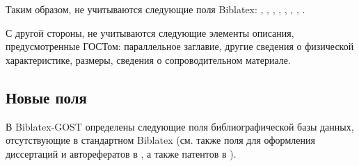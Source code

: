 \documentclass[10pt,a4paper,headings=small,numbers=enddot,english,russian]{ltxdockit}[2011/03/25]
\newcommand*{\biblatex}{Biblatex\xspace}
\newcommand*{\biblatexgost}{Biblatex-GOST\xspace}
\begin{document}
\endgroup

Таким образом, не учитываются следующие поля \biblatex:
, ,
, , , ,
, .

С другой стороны, не учитываются следующие элементы описания, предусмотренные ГОСТом:
параллельное заглавие, другие сведения о физической характеристике, размеры,
сведения о сопроводительном материале.

\subsection{Новые поля}
\label{sec:newfields}

В \biblatexgost определены следующие
поля библиографической базы данных, отсутствующие в стандартном \biblatex
(см. также поля для оформления диссертаций и авторефератов в ,
а также патентов в ).
\end{document}
